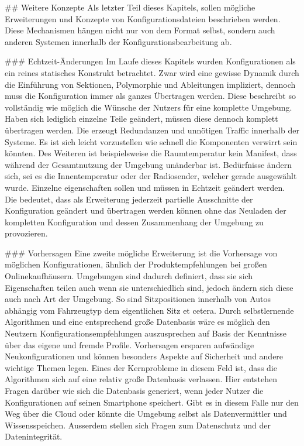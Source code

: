 ## Weitere Konzepte
Als letzter Teil dieses Kapitels, sollen mögliche Erweiterungen und Konzepte von Konfigurationsdateien beschrieben werden. Diese Mechanismen hängen nicht nur von dem Format selbst, sondern auch anderen Systemen innerhalb der Konfigurationsbearbeitung ab. 

### Echtzeit-Änderungen
Im Laufe dieses Kapitels wurden Konfigurationen als ein reines statisches Konstrukt betrachtet. Zwar wird eine gewisse Dynamik durch die Einführung von Sektionen, Polymorphie und Ableitungen impliziert, dennoch muss die Konfiguration immer als ganzes Übertragen werden. Diese beschreibt so vollständig wie möglich die Wünsche der Nutzers für eine komplette Umgebung. Haben sich lediglich einzelne Teile geändert, müssen diese dennoch komplett übertragen werden. Die erzeugt Redundanzen und unnötigen Traffic innerhalb der Systeme. Es ist sich leicht vorzustellen wie schnell die Komponenten verwirrt sein könnten. Des Weiteren ist beispielsweise die Raumtemperatur kein Manifest, dass während der Gesamtnutzung der Umgebung unänderbar ist. Bedürfnisse ändern sich, sei es die Innentemperatur oder der Radiosender, welcher gerade ausgewählt wurde. Einzelne eigenschaften sollen und müssen in Echtzeit geändert werden. Die bedeutet, dass als Erweiterung jederzeit partielle Ausschnitte der Konfiguration geändert und übertragen werden können ohne das Neuladen der kompletten Konfiguration und dessen Zusammenhang der Umgebung zu provozieren.

### Vorhersagen
Eine zweite mögliche Erweiterung ist die Vorhersage von möglichen Konfigurationen, ähnlich der Produktempfehlungen bei großen Onlinekaufhäusern. Umgebungen sind dadurch definiert, dass sie sich Eigenschaften teilen auch wenn sie unterschiedlich sind, jedoch ändern sich diese auch nach Art der Umgebung. So sind Sitzpositionen innerhalb von Autos abhängig vom Fahrzeugtyp dem eigentlichen Sitz et cetera. Durch selbstlernende Algorithmen und eine entsprechend große Datenbasis wäre es möglich den Neutzern Konfigurationsempfehlungen auszusprechen auf Basis der Kenntnisse über das eigene und fremde Profile. Vorhersagen ersparen aufwändige Neukonfigurationen und können besonders Aspekte auf Sicherheit und andere wichtige Themen legen. Eines der Kernprobleme in diesem Feld ist, dass die Algorithmen sich auf eine relativ große Datenbasis verlassen. Hier entstehen Fragen darüber wie sich die Datenbasis generiert, wenn jeder Nutzer die Konfigurationen auf seinen Smartphone speichert. Gibt es in diesem Falle nur den Weg über die Cloud oder könnte die Umgebung selbst als Datenvermittler und Wissensspeichen. Ausserdem stellen sich Fragen zum Datenschutz und der Datenintegrität. 

